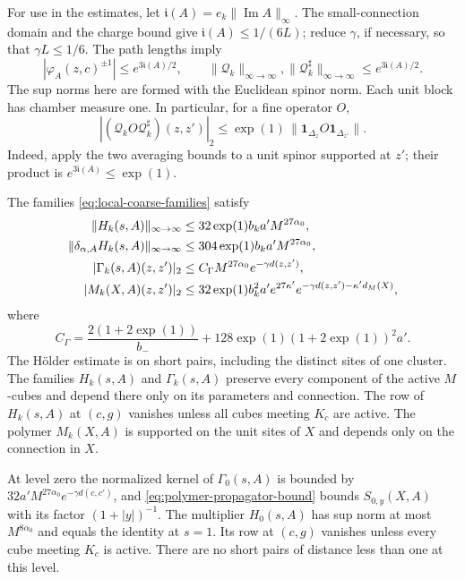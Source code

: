 For use in the estimates, let
$\mathfrak i(A)=e_k\|\operatorname{Im}A\|_\infty$.
The small-connection domain and the charge bound give
$\mathfrak i(A)\le1/(6L)$; reduce $\gamma$, if necessary, so that
$\gamma L\le1/6$. The path lengths imply
\begin{equation}\label{eq:coarse-phase-bounds}
 |\varphi_A(z,c)^{\pm1}|\le e^{3\mathfrak i(A)/2},\qquad
 \|\mathcal Q_k\|_{\infty\to\infty},
 \|\mathcal Q_k^\sharp\|_{\infty\to\infty}
       \le e^{3\mathfrak i(A)/2}.
\end{equation}
The sup norms here are formed with the Euclidean spinor norm.
Each unit block has chamber measure one. In particular, for a fine
operator $O$,
\begin{equation}\label{eq:block-compression-bound}
 |(\mathcal Q_kO\mathcal Q_k^\sharp)(z,z')|_2
       \le \exp(1)\,\|\mathbf1_{\Delta_z}O\mathbf1_{\Delta_{z'}}\|.
\end{equation}
Indeed, apply the two averaging bounds to a unit spinor supported at
$z'$; their product is $e^{3\mathfrak i(A)}\le \exp(1)$.

\begin{proposition}\label{prop:coarse-local-family-bounds}
The families \eqref{eq:local-coarse-families} satisfy
\begin{align}
 \|H_k(s,A)\|_{\infty\to\infty}
       &\le32\exp(1)b_ka'M^{27\alpha_0},\label{eq:weakened-H-bound}\\
 \|\delta_{\alpha,A}H_k(s,A)\|_{\infty\to\infty}
       &\le304\exp(1)b_ka'M^{27\alpha_0},\notag\\
 |\Gamma_k(s,A)(z,z')|_2
       &\le C_\Gamma M^{27\alpha_0}e^{-\gamma d(z,z')},
                                             \label{eq:weakened-Gamma-bound}\\
 |M_k(X,A)(z,z')|_2
       &\le32\exp(1)b_k^2a'e^{27\kappa'}
                     e^{-\gamma d(z,z')-\kappa'd_M(X)},\notag
\end{align}
where
\[
 C_\Gamma=\frac{2(1+2\exp(1))}{b_-}+128\exp(1)(1+2\exp(1))^2a'.
\]
The H\"older estimate is on short pairs, including the distinct
sites of one cluster. The families $H_k(s,A)$ and $\Gamma_k(s,A)$
preserve every component of the active $M$-cubes and depend there only
on its parameters and connection. The row of $H_k(s,A)$ at $(c,g)$
vanishes unless all cubes meeting $K_c$ are active. The polymer
$M_k(X,A)$ is supported on the unit sites of $X$ and depends only on
the connection in $X$.

At level zero the normalized kernel of $\Gamma_0(s,A)$ is bounded by
$32a'M^{27\alpha_0}e^{-\gamma d(c,c')}$, and
\eqref{eq:polymer-propagator-bound} bounds $S_{0,y}(X,A)$ with its
factor $(1+|y|)^{-1}$. The multiplier $H_0(s,A)$ has sup norm
at most $M^{8\alpha_0}$ and equals the identity at $s=1$.
Its row at $(c,g)$ vanishes unless every cube meeting $K_c$
is active. There are no short pairs of distance less than one
at this level.
\end{proposition}

